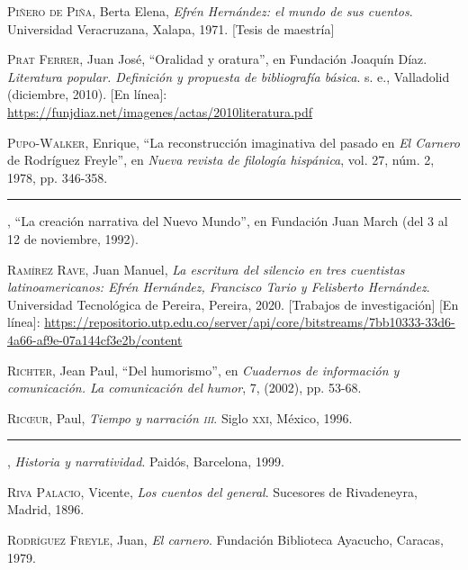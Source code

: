 \documentclass[14pt,twoside,final]{extbook} %
\begin{document}
\textsc{Piñero de Piña}, Berta Elena, \emph{Efrén Hernández: el mundo de sus cuentos}. Universidad Veracruzana, Xalapa, 1971. [Tesis de maestría]\label{bib:piñero1971}

\textsc{Prat Ferrer}, Juan José, ``Oralidad y oratura'', en Fundación Joaquín Díaz. \emph{Literatura popular. Definición y propuesta de bibliografía básica}. s. e., Valladolid (diciembre, 2010). [En línea]: \url{https://funjdiaz.net/imagenes/actas/2010literatura.pdf}\label{bib:prat2010}

\textsc{Pupo-Walker}, Enrique, ``La reconstrucción imaginativa del pasado en \emph{El Carnero} de Rodríguez Freyle'', en \emph{Nueva revista de filología hispánica}, vol. 27, núm. 2, 1978, pp. 346-358.\label{bib:pupowalker1978}

\rule{1cm}{0.4pt}, ``La creación narrativa del Nuevo Mundo'', en Fundación Juan March (del 3 al 12 de noviembre, 1992).\label{bib:pupowalker1992}

\textsc{Ramírez Rave}, Juan Manuel, \emph{La escritura del silencio en tres cuentistas latinoamericanos: Efrén Hernández, Francisco Tario y Felisberto Hernández}. Universidad Tecnológica de Pereira, Pereira, 2020. [Trabajos de investigación] [En línea]: \url{https://repositorio.utp.edu.co/server/api/core/bitstreams/7bb10333-33d6-4a66-af9e-07a144cf3e2b/content} \label{bib:ramírez2020}

\textsc{Richter}, Jean Paul, ``Del humorismo'', en \emph{Cuadernos de información y comunicación. La comunicación del humor}, 7, (2002), pp. 53-68.\label{bib:richter2002}

\textsc{Ric\oe ur}, Paul, \emph{Tiempo y narración \textsc{iii}}. Siglo \textsc{xxi}, México, 1996.

\rule{1cm}{0.4pt}, \emph{Historia y narratividad}. Paidós, Barcelona, 1999.

\textsc{Riva Palacio}, Vicente, \emph{Los cuentos del general}. Sucesores de Rivadeneyra, Madrid, 1896.\label{bib:rivapalacio1896}

\textsc{Rodríguez Freyle}, Juan, \emph{El carnero}. Fundación Biblioteca Ayacucho, Caracas, 1979.\label{bib:rodriguez1979}
\end{document}
